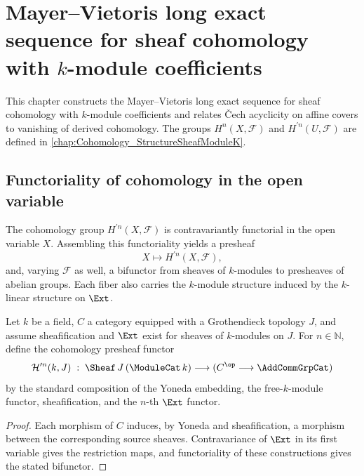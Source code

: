 \chapter{Mayer--Vietoris long exact sequence for sheaf cohomology with \(k\)-module coefficients}
\label{chap:Cohomology_MayerVietoris}

This chapter constructs the Mayer--Vietoris long exact sequence for sheaf cohomology with \(k\)-module coefficients and relates \v{C}ech acyclicity on affine covers to vanishing of derived cohomology. The groups \(H^n(X,\mathcal F)\) and \(H^{\prime n}(U,\mathcal F)\) are defined in \cref{chap:Cohomology_StructureSheafModuleK}.

\section{Functoriality of cohomology in the open variable}
\label{sec:hmodule_prime_cohomologyPresheaf}

The cohomology group \(H^{\prime n}(X,\mathcal F)\) is contravariantly functorial in the open variable \(X\). Assembling this functoriality yields a presheaf
\[
  X \longmapsto H^{\prime n}(X, \mathcal F),
\]
and, varying \(\mathcal F\) as well, a bifunctor from sheaves of \(k\)-modules to presheaves of abelian groups. Each fiber also carries the \(k\)-module structure induced by the \(k\)-linear structure on \(\Ext\).

\begin{definition}\leanok
  \label{def:Scheme_HModule_prime_cohomologyPresheafFunctor}

  Let \(k\) be a field, \(C\) a category equipped with a Grothendieck topology \(J\), and assume sheafification and \(\Ext\) exist for sheaves of \(k\)-modules on \(J\). For \(n \in \mathbb N\), define the cohomology presheaf functor
  \[
    \mathcal H^{\prime n}(k, J) \;:\; \Sheaf\,J\,(\ModuleCat\,k) \longrightarrow (C^{\op} \longrightarrow \AddCommGrpCat)
  \]
  by the standard composition of the Yoneda embedding, the free-\(k\)-module functor, sheafification, and the \(n\)-th \(\Ext\) functor.
\end{definition}

\begin{proof}

  \leanok
  Each morphism of \(C\) induces, by Yoneda and sheafification, a morphism between the corresponding source sheaves. Contravariance of \(\Ext\) in its first variable gives the restriction maps, and functoriality of these constructions gives the stated bifunctor.
\end{proof}

